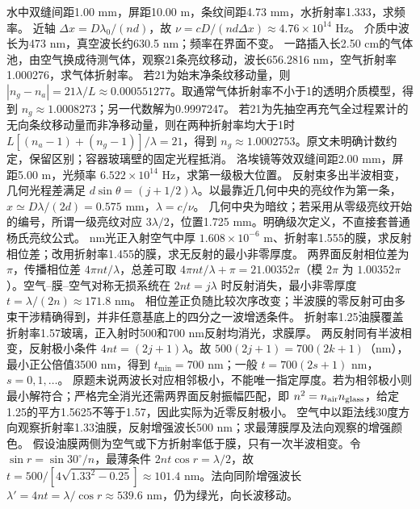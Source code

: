\problemtext 水中双缝间距1.00 mm，屏距10.00 m，条纹间距4.73 mm，水折射率1.333，求频率。
\workings 近轴 $\Delta x=D\lambda_0/(nd)$，故 $\nu=cD/(nd\Delta x)\approx4.76\times10^{14}$ Hz。
\crosscheck 介质中波长为473 nm，真空波长约630.5 nm；频率在界面不变。
\problemtext 一路插入长2.50 cm的气体池，由空气换成待测气体，观察21条亮纹移动，波长656.2816 nm，空气折射率1.000276，求气体折射率。
\workings 若21为始末净条纹移动量，则 $|n_g-n_a|=21\lambda/L\approx0.000551277$。取通常气体折射率不小于1的透明介质模型，得到 $n_g\approx1.0008273$；另一代数解为0.9997247。
\crosscheck 若21为先抽空再充气全过程累计的无向条纹移动量而非净移动量，则在两种折射率均大于1时 $L[(n_a-1)+(n_g-1)]/\lambda=21$，得到 $n_g\approx1.0002753$。原文未明确计数约定，保留区别；容器玻璃壁的固定光程抵消。
\problemtext 洛埃镜等效双缝间距2.00 mm，屏距5.00 m，光频率 $6.522\times10^{14}$ Hz，求第一级极大位置。
\workings 反射束多出半波相变，几何光程差满足 $d\sin\theta=(j+1/2)\lambda$。以最靠近几何中央的亮纹作为第一条，$x\simeq D\lambda/(2d)=0.575$ mm，$\lambda=c/\nu$。
\crosscheck 几何中央为暗纹；若采用从零级亮纹开始的编号，所谓一级亮纹对应 $3\lambda/2$，位置1.725 mm。明确级次定义，不直接套普通杨氏亮纹公式。
 nm光正入射空气中厚 $1.608\times10^{-6}$ m、折射率1.555的膜，求反射相位差；改用折射率1.455的膜，求无反射的最小非零厚度。
\workings 两界面反射相位差为 $\pi$，传播相位差 $4\pi nt/\lambda$，总差可取 $4\pi nt/\lambda+\pi=21.00352\pi$（模 $2\pi$ 为 $1.00352\pi$）。空气--膜--空气对称无损系统在 $2nt=j\lambda$ 时反射消失，最小非零厚度 $t=\lambda/(2n)\approx171.8$ nm。
\crosscheck 相位差正负随比较次序改变；半波膜的零反射可由多束干涉精确得到，并非任意基底上的四分之一波增透条件。
\problemtext 折射率1.25油膜覆盖折射率1.57玻璃，正入射时500和700 nm反射均消光，求膜厚。
\workings 两反射同有半波相变，反射极小条件 $4nt=(2j+1)\lambda$。故 $500(2j+1)=700(2k+1)$（nm），最小正公倍值3500 nm，得到 $t_{\min}=700$ nm；一般 $t=700(2s+1)$ nm，$s=0,1,\ldots$。
\crosscheck 原题未说两波长对应相邻极小，不能唯一指定厚度。若为相邻极小则最小解符合；严格完全消光还需两界面反射振幅匹配，即 $n^2=n_{\rm air}n_{\rm glass}$，给定1.25的平方1.5625不等于1.57，因此实际为近零反射极小。
\problemtext 空气中以距法线30度方向观察折射率1.33油膜，反射增强波长500 nm；求最薄膜厚及法向观察的增强颜色。
\workings 假设油膜两侧为空气或下方折射率低于膜，只有一次半波相变。令 $\sin r=\sin30^\circ/n$，最薄条件 $2nt\cos r=\lambda/2$，故 $t=500/[4\sqrt{1.33^2-0.25}]\approx101.4$ nm。法向同阶增强波长 $\lambda'=4nt=\lambda/\cos r\approx539.6$ nm，仍为绿光，向长波移动。
